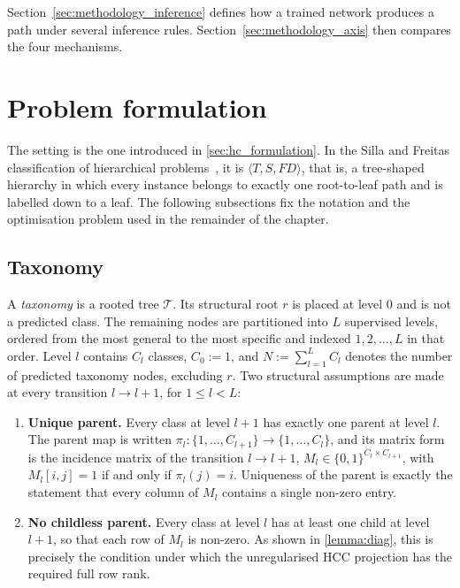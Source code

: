 Section~\ref{sec:methodology_inference} defines how a trained network produces a
path under several inference rules. Section~\ref{sec:methodology_axis} then
compares the four mechanisms.

\section{Problem formulation}
\label{sec:methodology_problem}

The setting is the one introduced in \cref{sec:hc_formulation}. In the Silla and
Freitas classification of hierarchical problems~\cite{silla2011survey}, it is
$\langle T, S, FD\rangle$, that is, a tree-shaped hierarchy in which every
instance belongs to exactly one root-to-leaf path and is labelled down to a leaf.
The following subsections fix the notation and the optimisation problem used in
the remainder of the chapter.

\subsection{Taxonomy}
\label{ssec:problem_taxonomy}

A \emph{taxonomy} is a rooted tree $\mathcal{T}$. Its structural root $r$ is
placed at level $0$ and is not a predicted class. The remaining nodes are
partitioned into $L$ supervised levels, ordered from the most general to the most
specific and indexed $1,2,\dots,L$ in that order. Level $l$ contains $C_l$
classes, $C_0:=1$, and $N:=\sum_{l=1}^{L}C_l$ denotes the number of predicted
taxonomy nodes, excluding $r$. Two structural assumptions are made at every
transition $l\to l+1$, for $1\leq l<L$:

\begin{enumerate}
    \item \textbf{Unique parent.} Every class at level $l+1$ has exactly one
    parent at level $l$. The parent map is written
    $\pi_l:\{1,\dots,C_{l+1}\}\to\{1,\dots,C_l\}$, and its matrix form is the
    incidence matrix of the transition $l\to l+1$,
    $M_l\in\{0,1\}^{C_l\times C_{l+1}}$, with
    $M_l[i,j]=1$ if and only if $\pi_l(j)=i$. Uniqueness of the parent is
    exactly the statement that every column of $M_l$ contains a single
    non-zero entry.
    \item \textbf{No childless parent.} Every class at level $l$ has at least one
    child at level $l+1$, so that each row of $M_l$ is non-zero. As shown in
    \cref{lemma:diag}, this is precisely the condition under which the
    unregularised HCC projection has the required full row rank.
\end{enumerate}

